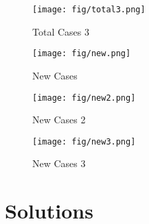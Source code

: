 \begin{figure}
	\centering
	\texttt{[image: fig/total3.png]}
	\caption{Total Cases 3}
\end{figure}

\begin{figure}
	\centering
	\texttt{[image: fig/new.png]}
	\caption{New Cases}
\end{figure}

\begin{figure}
	\centering
	\texttt{[image: fig/new2.png]}
	\caption{New Cases 2}
\end{figure}

\begin{figure}
	\centering
	\texttt{[image: fig/new3.png]}
	\caption{New Cases 3}
\end{figure}


\section{Solutions}






